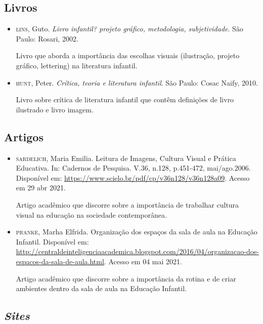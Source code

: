 \documentclass[11pt]{extarticle}
\begin{document}
\subsection{Livros} 

\begin{itemize}
\item \textsc{lins}, Guto. \textit{Livro infantil? projeto gráfico, metodologia, subjetividade}. São Paulo: Rosari, 2002.

Livro que aborda a importância das escolhas visuais (ilustração, projeto gráfico, lettering) na literatura infantil.  

\item \textsc{hunt}, Peter. \textit{Crítica, teoria e literatura infantil}. São Paulo: Cosac Naify, 2010.

Livro sobre crítica de literatura infantil que contêm definições de livro ilustrado e livro imagem. 
\end{itemize}

\subsection{Artigos}

\begin{itemize}
\item \textsc{sardelich}, Maria Emilia. Leitura de Imagens, Cultura Visual e Prática Educativa. 
In: Cadernos de Pesquisa. V.36, n.128, p.451-472, mai/ago.2006. Disponível em: \url{https://www.scielo.br/pdf/cp/v36n128/v36n128a09}. 
Acesso em 29 abr 2021. 

Artigo acadêmico que discorre sobre a importância de trabalhar cultura 
visual na educação na sociedade contemporânea. 

\item \textsc{pranke}, Marha Elfrida. Organização dos espaços da sala de aula na Educação Infantil. Disponível em: \url{http://centraldeinteligenciaacademica.blogspot.com/2016/04/organizacao-dos-espacos-da-sala-de-aula.html}. Acesso em 04 mai 2021. 

Artigo acadêmico que discorre sobre a importância da rotina e de criar ambientes dentro da sala de aula na Educação Infantil.  
\end{itemize}

\subsection{\textit{Sites}}
\end{document}
